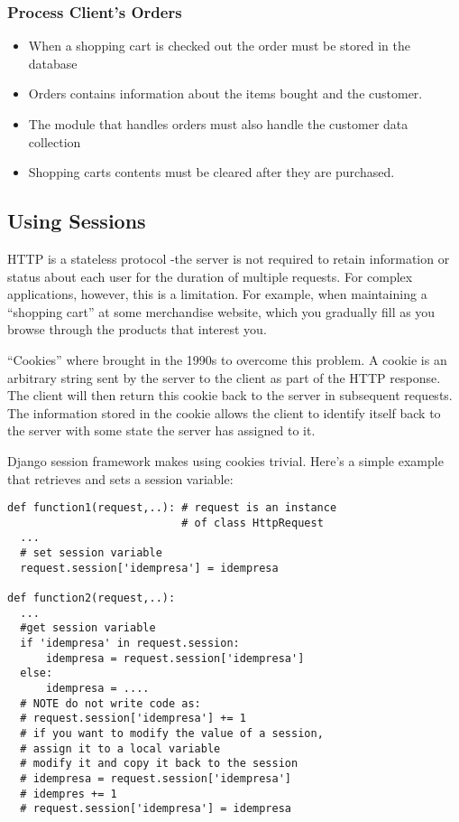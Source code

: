 \documentclass[12pt]{article} %
\begin{document}
\subsubsection{Process Client's Orders}
\begin{itemize}
  \item When a shopping cart is checked out the order must be stored in the database
  \item Orders contains information about the items bought and the customer.
  \item The module that handles orders must also handle the customer data collection
  \item Shopping carts contents must be cleared after they are purchased.
\end{itemize}


\subsection{Using Sessions}

HTTP is a stateless protocol -the server is not required to retain information or status about each user for the duration of multiple requests. For complex applications, however, this is a limitation. For example, when maintaining a ``shopping cart'' at some merchandise website, which you gradually fill as you browse through the products that interest you.

``Cookies'' where brought in the 1990s to overcome this problem. A cookie is an arbitrary string sent by the server to the client as part of the HTTP response. The client will then return this cookie back to the server in subsequent requests. The information stored in the cookie allows the client to identify itself back to the server with some state the server has assigned to it.

Django session framework makes using cookies trivial. Here's a simple example that retrieves and sets a session variable:\\

\begin{lstlisting}
def function1(request,..): # request is an instance 
                           # of class HttpRequest
  ...
  # set session variable
  request.session['idempresa'] = idempresa

def function2(request,..): 
  ...
  #get session variable
  if 'idempresa' in request.session:
      idempresa = request.session['idempresa']
  else:
      idempresa = ....
  # NOTE do not write code as:
  # request.session['idempresa'] += 1
  # if you want to modify the value of a session, 
  # assign it to a local variable
  # modify it and copy it back to the session
  # idempresa = request.session['idempresa']
  # idempres += 1
  # request.session['idempresa'] = idempresa
\end{lstlisting}
\end{document}
